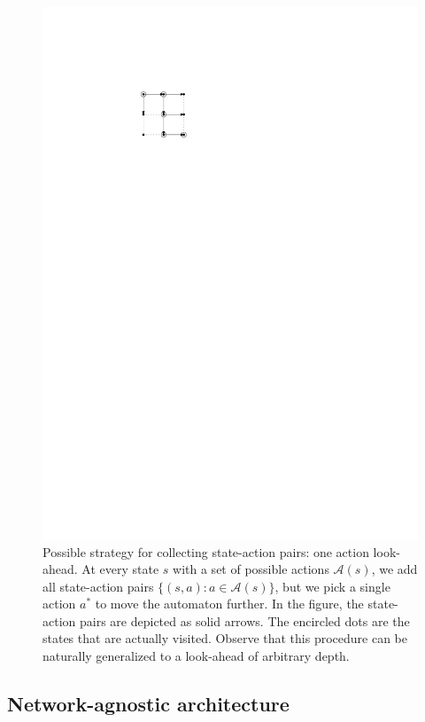 \documentclass[a4paper]{article}
\theoremstyle{definition}
\theoremstyle{plain}
\begin{document}
\begin{figure}
  \centering
  \includegraphics[scale=1.5]{figures/network/state_action_collection}
  \caption{Possible strategy for collecting state-action pairs: one action
    look-ahead. At every state $s$ with a set of possible actions
    $\mathcal{A}(s)$, we add all state-action pairs
    $\{ (s, a) : a \in \mathcal{A}(s) \}$, but we pick a single action $a^{*}$
    to move the automaton further. In the figure, the state-action pairs are
    depicted as solid arrows. The encircled dots are the states that are
    actually visited. Observe that this procedure can be naturally generalized
    to a look-ahead of arbitrary depth.}
  \label{fig:state_action_collection}
\end{figure}

\subsection{Network-agnostic architecture}
\end{document}
